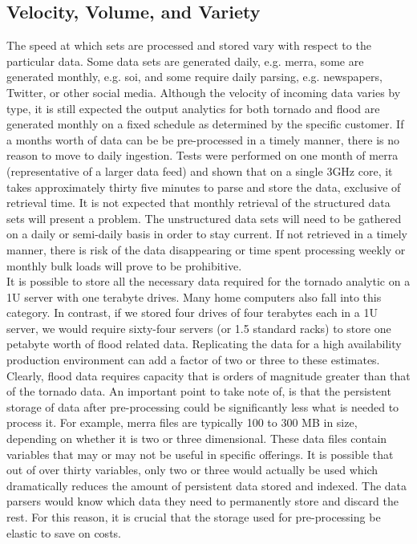 \subsection{Velocity, Volume, and Variety}
The speed at which sets are processed and stored vary with respect to the particular data. Some data sets are generated daily, e.g. \gls{merra}, some are generated monthly, e.g. \gls{soi}, and some require daily parsing, e.g. newspapers, Twitter, or other social media. Although the velocity of incoming data varies by type, it is still expected the output analytics for both tornado and flood are generated monthly on a fixed schedule as determined by the specific customer. If a months worth of data can be be pre-processed in a timely manner, there is no reason to move to daily ingestion. Tests were performed on one month of  \gls{merra} (representative of a larger data feed) and shown that on a single 3GHz core, it takes approximately thirty five minutes to parse and store the data, exclusive of retrieval time. It is not expected that monthly retrieval of the structured data sets will present a problem. The unstructured data sets will need to be gathered on a daily or semi-daily basis in order to stay current. If not retrieved in a timely manner, there is risk of the data disappearing or time spent processing weekly or monthly bulk loads will prove to be prohibitive.\\

It is possible to store all the necessary data required for the tornado analytic on a 1U server with one terabyte drives. Many home computers also fall into this category. In contrast, if we stored four drives of four terabytes each in a 1U server, we would require sixty-four servers  (or 1.5 standard racks) to store one petabyte worth of flood related data. Replicating the data for a high availability production environment can add a factor of two or three to these estimates. Clearly, flood data requires capacity that is orders of magnitude greater than that of the tornado data. An important point to take note of, is that the persistent storage of data after pre-processing could be significantly less what is needed to process it. For example, \gls{merra} files are typically 100 to 300 MB in size, depending on whether it is two or three dimensional. These data files contain variables that may or may not be useful in specific offerings. It is possible that out of over thirty variables, only two or three would actually be used which dramatically reduces the amount of persistent data stored and indexed. The data parsers would know which data they need to permanently store and discard the rest. For this reason, it is crucial that the storage used for pre-processing be elastic to save on costs.\\

